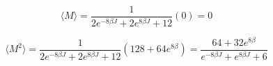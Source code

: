 \documentclass[10pt,a4paper]{article}
\begin{document}
\begin{equation}
\langle M \rangle = \frac{1}{2e^{-8\beta J} + 2e^{8\beta J} + 12} (0) = 0
\end{equation}

\begin{equation}
\langle M^2 \rangle = \frac{1}{2e^{-8\beta J} + 2e^{8\beta J} + 12} (128+64e^{8\beta}) = \frac{64 + 32e^{8\beta}}{e^{-8\beta J} + e^{8\beta J} + 6}
\end{equation}









\printbibliography %
\end{document}
